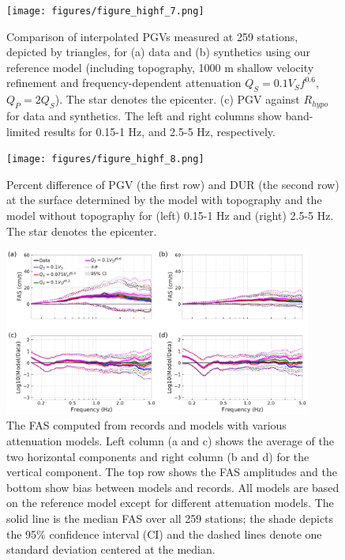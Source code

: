 \begin{figure}[!ht]
  \centering
  \texttt{[image: figures/figure\_highf\_7.png]}
  \caption{Comparison of interpolated PGVs measured at 259 stations, depicted by triangles, for (a) data and (b) synthetics using our reference model (including topography, 1000 m shallow velocity refinement and frequency-dependent attenuation $Q_S=0.1V_Sf^{0.6}$, $Q_P=2Q_S$). The star denotes the epicenter. (c) PGV against $R_{hypo}$ for data and synthetics. The left and right columns show band-limited results for 0.15-1 Hz, and 2.5-5 Hz, respectively.
  }
  \label{fig:highf-7}
\end{figure}
\clearpage

\begin{figure}[!ht]
  \centering
  \texttt{[image: figures/figure\_highf\_8.png]}
  \caption{Percent difference of PGV (the first row) and DUR (the second row) at the surface determined by the model with topography and the model without topography for (left) 0.15-1 Hz and (right) 2.5-5 Hz. The star denotes the epicenter.
  }
  \label{fig:highf-8}
\end{figure}
\clearpage

\begin{figure}[!ht]
  \centering
  \includegraphics[width=0.9\textwidth,height=0.9\textheight,keepaspectratio]{figures/figure_highf_9.pdf}
  \caption{The FAS computed from records and models with various attenuation models. Left column (a and c) shows the average of the two horizontal components and right column (b and d) for the vertical component. The top row shows the FAS amplitudes and the bottom show bias between models and records. All models are based on the reference model except for different attenuation models. The solid line is the median FAS over all 259 stations; the shade depicts the 95\% confidence interval (CI) and the dashed lines denote one standard deviation centered at the median.
  }
  \label{fig:highf-9}
\end{figure}
\clearpage

